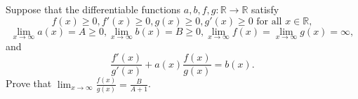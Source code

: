 Suppose that the differentiable functions $a, b, f, g:\mathbb{R} \rightarrow \mathbb{R} $ satisfy
\[ f(x)\geq 0, f'(x) \geq 0,g(x)\geq 0, g'(x) \geq 0 \text{ for all } x \in \mathbb{R}, \]\[\lim_{x\rightarrow \infty} a(x)=A\geq 0,\lim_{x\rightarrow \infty} b(x)=B\geq 0, \lim_{x\rightarrow \infty} f(x)=\lim_{x\rightarrow \infty} g(x)=\infty,\]and
\[\frac{f'(x)}{g'(x)}+a(x)\frac{f(x)}{g(x)}=b(x).\]Prove that $\lim_{x\rightarrow\infty}\frac{f(x)}{g(x)}=\frac{B}{A+1}$.